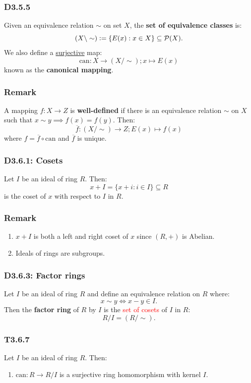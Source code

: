 \documentclass{article}
\newcommand{\deq}{\vcentcolon=}
\begin{document}
\begin{multicols*}{3}
\subsubsection*{D3.5.5}
Given an equivalence relation $\sim$ on set $X$,
the \textbf{set of equivalence classes} is:
$$(X\backslash\sim)\deq\{E(x):x\in X\}
\subseteq\mathcal{P}(X).$$
We also define a \underline{surjective} map:
$$\text{can}:X\rightarrow(X/\sim);x\mapsto E(x)$$
known as the \textbf{canonical mapping}.

\subsubsection*{Remark}
A mapping $f:X\rightarrow Z$ is \textbf{well-defined} if
there is an equivalence relation $\sim$ on $X$ such that
$x\sim y\implies f(x)=f(y)$. Then:
$$\overline{f}:(X/\sim)\rightarrow Z;
E(x)\mapsto f(x)$$
where $f=\overline{f}\circ\text{can}$ and $\overline{f}$ is unique.

\subsubsection*{D3.6.1: Cosets}
Let $I$ be an ideal of ring $R$. Then:
$$x+I=\{x+i:i\in I\}\subseteq R$$
is the coset of $x$ with respect to $I$ in $R$.

\subsubsection*{Remark}
\begin{enumerate}
    \item $x+I$ is both a left and right coset of $x$
    since $(R,+)$ is Abelian.

    \item Ideals of rings are subgroups.
\end{enumerate}

\subsubsection*{D3.6.3: Factor rings}
Let $I$ be an ideal of ring $R$ and define an
equivalence relation on $R$ where:
$$x\sim y\iff x-y\in I.$$
Then the \textbf{factor ring} of $R$ by $I$ is the \textcolor{red}{set
of cosets} of $I$ in $R$:
$$R/I=(R/\sim).$$

\subsubsection*{T3.6.7}
Let $I$ be an ideal of ring $R$. Then:
\begin{enumerate}
    \item $\text{can}:R\rightarrow R/I$ is a surjective
    ring homomorphism with kernel $I$.


\end{enumerate}
\end{multicols*}
\end{document}
